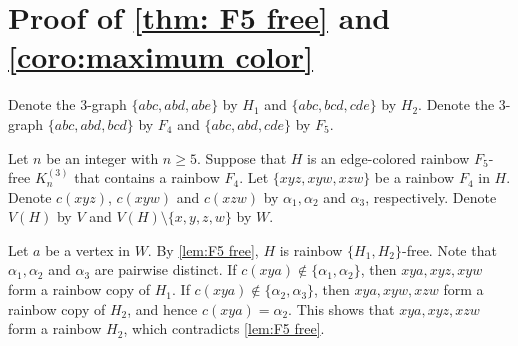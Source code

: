 \documentclass[10pt,a4paper]{article}
\theoremstyle{definition}
\begin{document}
\section{Proof of \cref{thm: F5 free} and \cref{coro:maximum color}}\label{sec: proof of 2}

Denote the $3$-graph $\{abc,abd,abe\}$ by $H_1$ and $\{abc,bcd,cde\}$ by $H_2$. %
Denote the $3$-graph $\{abc,abd,bcd\}$ by $F_4$ and $\{abc,abd,cde\}$ by $F_5$.

\medskip


Let $n$ be an integer with $n\ge5$.
Suppose that $H$ is an edge-colored rainbow $F_5$-free $K_n^{(3)}$ that contains a rainbow $F_4$.
Let $\{xyz,xyw,xzw\}$ be a rainbow $F_4$ in $H$.
Denote $c(xyz)$, $c(xyw)$ and $c(xzw)$ by $\alpha_1,\alpha_2$ and $\alpha_3$, respectively.
Denote $V(H)$ by $V$ and $V(H)\setminus\{x,y,z,w\}$ by $W$.

Let $a$ be a vertex in $W$.
By \cref{lem:F5 free}, $H$ is rainbow $\{H_1,H_2\}$-free.
Note that $\alpha_1,\alpha_2$ and $\alpha_3$ are pairwise distinct.
If $c(xya)\notin\{\alpha_1,\alpha_2\}$, then $xya,xyz,xyw$ form a rainbow copy of $H_1$.
If $c(xya)\notin\{\alpha_2,\alpha_3\}$, then $xya,xyw,xzw$ form a rainbow copy of $H_2$, and hence $c(xya)=\alpha_2$.
This shows that $xya,xyz,xzw$ form a rainbow $H_2$, which contradicts \cref{lem:F5 free}.
\end{document}
